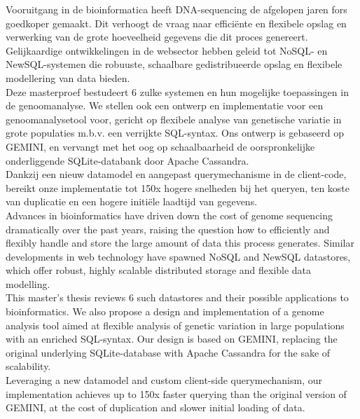Vooruitgang in de bioinformatica heeft DNA-sequencing de afgelopen jaren fors goedkoper gemaakt. Dit verhoogt de vraag naar effici\"ente en flexibele opslag en verwerking van de grote hoeveelheid gegevens die dit proces genereert. Gelijkaardige ontwikkelingen in de websector hebben geleid tot NoSQL- en NewSQL-systemen die robuuste, schaalbare gedistribueerde opslag en flexibele modellering van data bieden.\\
Deze masterproef bestudeert 6 zulke systemen en hun mogelijke toepassingen in de genoomanalyse. We stellen ook een ontwerp en implementatie voor een genoomanalysetool voor, gericht op flexibele analyse van genetische variatie in grote populaties m.b.v. een verrijkte SQL-syntax. Ons ontwerp is gebaseerd op GEMINI, en vervangt met het oog op schaalbaarheid de oorspronkelijke onderliggende SQLite-databank door Apache Cassandra.\\
Dankzij een nieuw datamodel en aangepast querymechanisme in de client-code, bereikt onze implementatie tot 150x hogere snelheden bij het queryen, ten koste van duplicatie en een hogere initi\"ele laadtijd van gegevens.\\

\noindent Advances in bioinformatics have driven down the cost of genome sequencing dramatically over the past years, raising the question how to efficiently and flexibly handle and store the large amount of data this process generates. Similar developments in web technology have spawned NoSQL and NewSQL datastores, which offer robust, highly scalable distributed storage and flexible data modelling. \\
This master's thesis reviews 6 such datastores and their possible applications to bioinformatics. We also propose a design and implementation of a genome analysis tool aimed at flexible analysis of genetic variation in large populations with an enriched SQL-syntax. Our design is based on GEMINI, replacing the original underlying SQLite-database with Apache Cassandra for the sake of scalability.\\
Leveraging a new datamodel and custom client-side querymechanism, our implementation achieves up to 150x faster querying than the original version of GEMINI, at the cost of duplication and slower initial loading of data.\\
